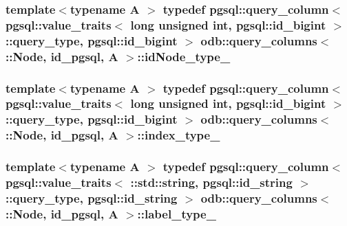 \subsubsection[{id\+Node\+\_\+type\+\_\+}]{\setlength{\rightskip}{0pt plus 5cm}template$<$typename A $>$ typedef pgsql\+::query\+\_\+column$<$ pgsql\+::value\+\_\+traits$<$ long unsigned int, pgsql\+::id\+\_\+bigint $>$\+::query\+\_\+type, pgsql\+::id\+\_\+bigint $>$ odb\+::query\+\_\+columns$<$ \+::{\bf Node}, id\+\_\+pgsql, A $>$\+::{\bf id\+Node\+\_\+type\+\_\+}}\label{structodb_1_1query__columns_3_01_1_1_node_00_01id__pgsql_00_01_a_01_4_a46023ceac6e1a9642073db0b3a123053}
\hypertarget{structodb_1_1query__columns_3_01_1_1_node_00_01id__pgsql_00_01_a_01_4_a64592e84000ac1b60ab1a62f80fa55db}{}
\subsubsection[{index\+\_\+type\+\_\+}]{\setlength{\rightskip}{0pt plus 5cm}template$<$typename A $>$ typedef pgsql\+::query\+\_\+column$<$ pgsql\+::value\+\_\+traits$<$ long unsigned int, pgsql\+::id\+\_\+bigint $>$\+::query\+\_\+type, pgsql\+::id\+\_\+bigint $>$ odb\+::query\+\_\+columns$<$ \+::{\bf Node}, id\+\_\+pgsql, A $>$\+::{\bf index\+\_\+type\+\_\+}}\label{structodb_1_1query__columns_3_01_1_1_node_00_01id__pgsql_00_01_a_01_4_a64592e84000ac1b60ab1a62f80fa55db}
\hypertarget{structodb_1_1query__columns_3_01_1_1_node_00_01id__pgsql_00_01_a_01_4_a9bb2b1fcd94c969f5d18da731e83e972}{}
\subsubsection[{label\+\_\+type\+\_\+}]{\setlength{\rightskip}{0pt plus 5cm}template$<$typename A $>$ typedef pgsql\+::query\+\_\+column$<$ pgsql\+::value\+\_\+traits$<$ \+::std\+::string, pgsql\+::id\+\_\+string $>$\+::query\+\_\+type, pgsql\+::id\+\_\+string $>$ odb\+::query\+\_\+columns$<$ \+::{\bf Node}, id\+\_\+pgsql, A $>$\+::{\bf label\+\_\+type\+\_\+}}\label{structodb_1_1query__columns_3_01_1_1_node_00_01id__pgsql_00_01_a_01_4_a9bb2b1fcd94c969f5d18da731e83e972}
\hypertarget{structodb_1_1query__columns_3_01_1_1_node_00_01id__pgsql_00_01_a_01_4_a23b6e7e1613f6c49d22ed865945c6325}{}
